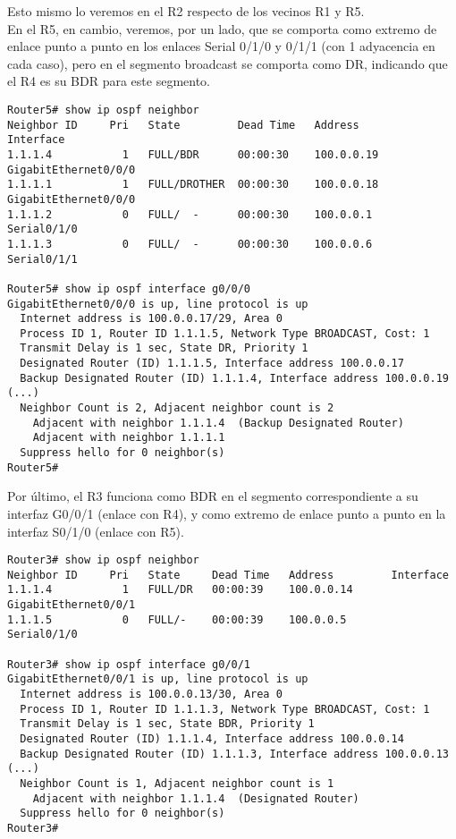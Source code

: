 \documentclass{article}
\begin{document}
Esto mismo lo veremos en el R2 respecto de los vecinos R1 y R5. \\

En el R5, en cambio, veremos, por un lado, que se comporta como extremo de enlace punto a punto en los enlaces Serial 0/1/0 y 0/1/1 (con 1 adyacencia en cada caso), pero en el segmento broadcast se comporta como DR, indicando que el R4 es su BDR para este segmento. \\

\begin{verbatim}
Router5# show ip ospf neighbor
Neighbor ID     Pri   State         Dead Time   Address         Interface
1.1.1.4           1   FULL/BDR      00:00:30    100.0.0.19      GigabitEthernet0/0/0
1.1.1.1           1   FULL/DROTHER  00:00:30    100.0.0.18      GigabitEthernet0/0/0
1.1.1.2           0   FULL/  -      00:00:30    100.0.0.1       Serial0/1/0
1.1.1.3           0   FULL/  -      00:00:30    100.0.0.6       Serial0/1/1

Router5# show ip ospf interface g0/0/0
GigabitEthernet0/0/0 is up, line protocol is up
  Internet address is 100.0.0.17/29, Area 0
  Process ID 1, Router ID 1.1.1.5, Network Type BROADCAST, Cost: 1
  Transmit Delay is 1 sec, State DR, Priority 1
  Designated Router (ID) 1.1.1.5, Interface address 100.0.0.17
  Backup Designated Router (ID) 1.1.1.4, Interface address 100.0.0.19
(...)
  Neighbor Count is 2, Adjacent neighbor count is 2
    Adjacent with neighbor 1.1.1.4  (Backup Designated Router)
    Adjacent with neighbor 1.1.1.1
  Suppress hello for 0 neighbor(s)
Router5#

\end{verbatim}

Por \'ultimo, el R3 funciona como BDR en el segmento correspondiente a su interfaz G0/0/1 (enlace con R4), y como extremo de enlace punto a punto en la interfaz S0/1/0 (enlace con R5). \\

\begin{verbatim}
Router3# show ip ospf neighbor
Neighbor ID     Pri   State     Dead Time   Address         Interface
1.1.1.4           1   FULL/DR   00:00:39    100.0.0.14      GigabitEthernet0/0/1
1.1.1.5           0   FULL/-    00:00:39    100.0.0.5       Serial0/1/0

Router3# show ip ospf interface g0/0/1
GigabitEthernet0/0/1 is up, line protocol is up
  Internet address is 100.0.0.13/30, Area 0
  Process ID 1, Router ID 1.1.1.3, Network Type BROADCAST, Cost: 1
  Transmit Delay is 1 sec, State BDR, Priority 1
  Designated Router (ID) 1.1.1.4, Interface address 100.0.0.14
  Backup Designated Router (ID) 1.1.1.3, Interface address 100.0.0.13
(...)
  Neighbor Count is 1, Adjacent neighbor count is 1
    Adjacent with neighbor 1.1.1.4  (Designated Router)
  Suppress hello for 0 neighbor(s)
Router3#

\end{verbatim}
\end{document}
